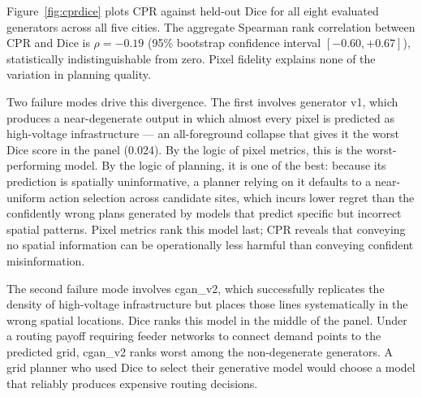 \documentclass[10pt,a4paper]{article}
\begin{document}
Figure~\ref{fig:cprdice} plots CPR against held-out Dice for all
eight evaluated generators across all five cities. The aggregate
Spearman rank correlation between CPR and Dice is $\rho = -0.19$
(95\% bootstrap confidence interval $[-0.60, +0.67]$), statistically
indistinguishable from zero. Pixel fidelity explains none of the
variation in planning quality.

Two failure modes drive this divergence. The first involves
generator v1, which produces a near-degenerate output in which
almost every pixel is predicted as high-voltage infrastructure
--- an all-foreground collapse that gives it the worst Dice score
in the panel (0.024). By the logic of pixel metrics, this is the
worst-performing model. By the logic of planning, it is one of the
best: because its prediction is spatially uninformative, a planner
relying on it defaults to a near-uniform action selection across
candidate sites, which incurs lower regret than the confidently
wrong plans generated by models that predict specific but
incorrect spatial patterns. Pixel metrics rank this model last;
CPR reveals that conveying no spatial information can be
operationally less harmful than conveying confident misinformation.

The second failure mode involves cgan\_v2, which successfully
replicates the density of high-voltage infrastructure but places
those lines systematically in the wrong spatial locations. Dice
ranks this model in the middle of the panel. Under a routing
payoff requiring feeder networks to connect demand points to the
predicted grid, cgan\_v2 ranks worst among the non-degenerate
generators. A grid planner who used Dice to select their
generative model would choose a model that reliably produces
expensive routing decisions.
\end{document}
